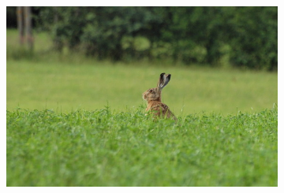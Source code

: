 \begin{figure}[H]
    \centering
    \begin{subfigure}{1\textwidth}
      \centering
      \includegraphics[scale=1.0]{obrazky/ORIGzajic2.jpg}
      \caption{}
    \end{subfigure}
    \vspace{1pt}
    

\end{figure}
